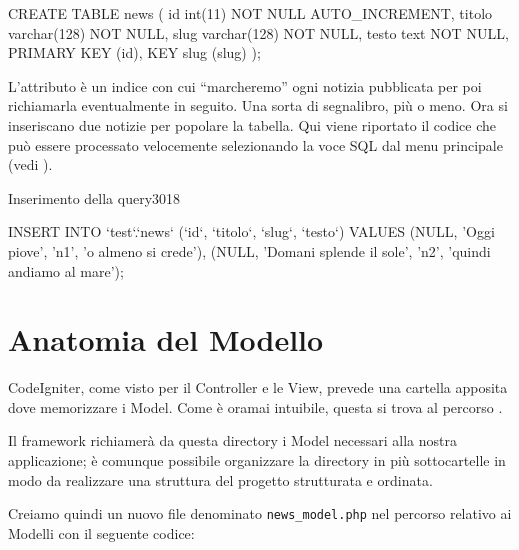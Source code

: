 \begin{code}
CREATE TABLE news (
	id int(11) NOT NULL AUTO_INCREMENT,
	titolo varchar(128) NOT NULL,
	slug varchar(128) NOT NULL,
	testo text NOT NULL,
	PRIMARY KEY (id),
	KEY slug (slug)
);
\end{code}

L'attributo  è un indice con cui ``marcheremo'' ogni notizia pubblicata per poi richiamarla eventualmente in seguito. Una sorta di segnalibro, più o meno. Ora si inseriscano due notizie per popolare la tabella. Qui viene riportato il codice che può essere processato velocemente selezionando la voce SQL dal menu principale (vedi ).

\begin{img}{Inserimento della query}{3}{018}
\end{img}

\begin{code}
INSERT INTO `test`.`news` (`id`, `titolo`, `slug`, `testo`) 
VALUES (NULL, 'Oggi piove', 'n1', 'o almeno si crede'), 
	(NULL, 'Domani splende il sole', 'n2', 'quindi andiamo al mare');
\end{code}

\section*{Anatomia del Modello}
CodeIgniter, come visto per il Controller e le View, prevede una cartella apposita dove memorizzare i Model. Come è oramai intuibile, questa si trova al percorso .

Il framework richiamerà da questa directory i Model necessari alla nostra applicazione; è comunque possibile organizzare la directory in più sottocartelle in modo da realizzare una struttura del progetto strutturata e ordinata.

Creiamo quindi un nuovo file denominato \verb|news_model.php| nel percorso relativo ai Modelli con il seguente codice:


